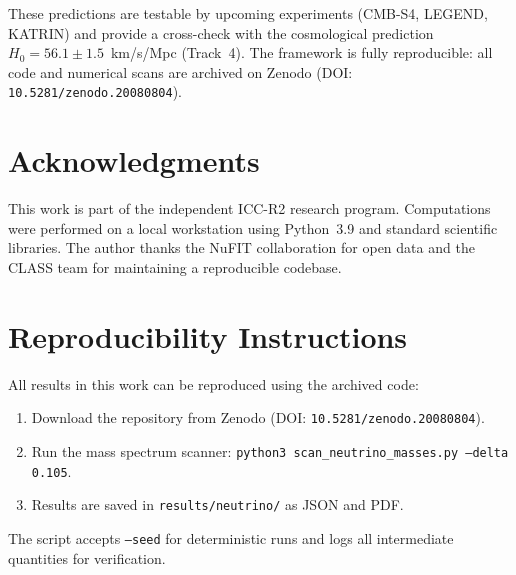 \documentclass[11pt,a4paper]{article}
\newcommand{\code}[1]{\texttt{#1}}
\newcommand{\zenodoDOITrackTwo}{10.5281/zenodo.20080804} %
\begin{document}
These predictions are testable by upcoming experiments (CMB-S4, LEGEND, KATRIN) and provide a cross-check with the cosmological prediction $H_0 = 56.1 \pm 1.5$~km/s/Mpc (Track~4). The framework is fully reproducible: all code and numerical scans are archived on Zenodo (DOI: \texttt{\zenodoDOITrackTwo}).

\section*{Acknowledgments}
\noindent
This work is part of the independent ICC-R2 research program. Computations were performed on a local workstation using Python~3.9 and standard scientific libraries. The author thanks the NuFIT collaboration for open data and the CLASS team for maintaining a reproducible codebase.




\appendix
\section{Reproducibility Instructions}
\label{app:repro}

All results in this work can be reproduced using the archived code:
\begin{enumerate}
    \item Download the repository from Zenodo (DOI: \texttt{\zenodoDOITrackTwo}).
    \item Run the mass spectrum scanner: \code{python3 scan\_neutrino\_masses.py --delta 0.105}.
    \item Results are saved in \code{results/neutrino/} as JSON and PDF.
\end{enumerate}

The script accepts \code{--seed} for deterministic runs and logs all intermediate quantities for verification.
\end{document}

